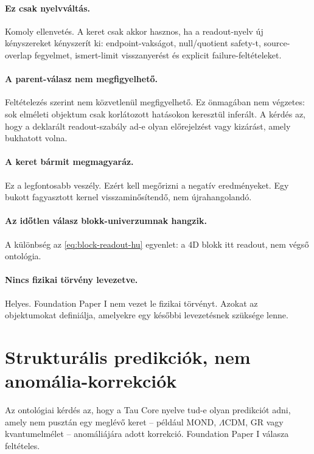 \documentclass[12pt]{article}
\begin{document}
\paragraph{Ez csak nyelvváltás.}
Komoly ellenvetés.  A keret csak akkor hasznos, ha a readout-nyelv új
kényszereket kényszerít ki: endpoint-vakságot, null/quotient safety-t,
source-overlap fegyelmet, ismert-limit visszanyerést és explicit
failure-feltételeket.

\paragraph{A parent-válasz nem megfigyelhető.}
Feltételezés szerint nem közvetlenül megfigyelhető.  Ez önmagában nem végzetes:
sok elméleti objektum csak korlátozott hatásokon keresztül inferált.  A kérdés
az, hogy a deklarált readout-szabály ad-e olyan előrejelzést vagy kizárást,
amely bukhatott volna.

\paragraph{A keret bármit megmagyaráz.}
Ez a legfontosabb veszély.  Ezért kell megőrizni a negatív eredményeket.  Egy
bukott fagyasztott kernel visszaminősítendő, nem újrahangolandó.

\paragraph{Az időtlen válasz blokk-univerzumnak hangzik.}
A különbség az \eqref{eq:block-readout-hu} egyenlet: a 4D blokk itt readout,
nem végső ontológia.

\paragraph{Nincs fizikai törvény levezetve.}
Helyes.  Foundation Paper I nem vezet le fizikai törvényt.  Azokat az
objektumokat definiálja, amelyekre egy későbbi levezetésnek szüksége lenne.

\section{Strukturális predikciók, nem anomália-korrekciók}

Az ontológiai kérdés az, hogy a Tau Core nyelve tud-e olyan predikciót adni,
amely nem pusztán egy meglévő keret -- például MOND, \(\Lambda\)CDM, GR vagy
kvantumelmélet -- anomáliájára adott korrekció.  Foundation Paper I válasza
feltételes.
\end{document}
